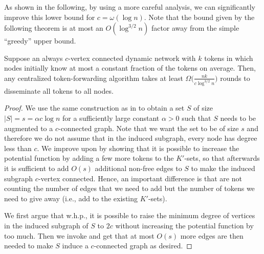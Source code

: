 \documentclass{llncs}
\begin{document}
As shown in the following, by using a more careful analysis, we can
significantly improve this lower bound for $c=\omega(\log n)$.  Note
that the bound given by the following theorem is at most an $O(\log^{3/2}
n)$ factor away from the simple ``greedy'' upper bound.

\begin{theorem}\label{lem:cconLB2}
    Suppose an always $c$-vertex connected dynamic network with $k$
    tokens in which nodes initially know at most a constant fraction
    of the tokens on average.  Then, any centralized token-forwarding
    algorithm takes at least $\Omega\big(\frac{nk}{c\log^{3/2} n}\big)$
    rounds to disseminate all tokens to all nodes.
\end{theorem}
\begin{proof}
    We use the same construction as in  to obtain a
    set $S$ of size $|S| = s = \alpha c \log n$ for a sufficiently
    large constant $\alpha>0$ such that $S$ needs to be augmented to a
    $c$-connected graph. Note that we want the set to be of size $s$
    and therefore we do not assume that in the induced subgraph, every
    node has degree less than $c$. We improve upon 
    by showing that it is possible to increase the potential function
    by adding a few more tokens to the $K'$-sets, so that afterwards
    it is sufficient to add $O(s)$ additional non-free edges to $S$ to
    make the induced subgraph $c$-vertex connected.  Hence, an
    important difference is that are not counting the number of edges
    that we need to add but the number of tokens we need to give away
    (i.e., add to the existing $K'$-sets).

    We first argue that w.h.p., it is possible to raise the minimum
    degree of vertices in the induced subgraph of $S$ to $2c$ without
    increasing the potential function by too much. Then we invoke
     and get that at most $O(s)$ more edges
    are then needed to make $S$ induce a $c$-connected graph as
    desired.


\end{proof}
\end{document}
